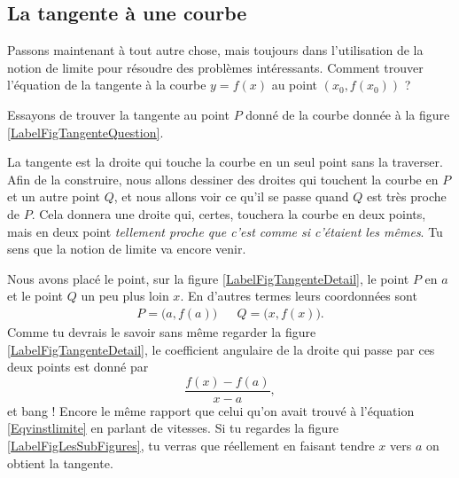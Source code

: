 \subsection{La tangente à une courbe}

Passons maintenant à tout autre chose, mais toujours dans l'utilisation de la notion de limite pour résoudre des problèmes intéressants. Comment trouver l'équation de la tangente à la courbe $y=f(x)$ au point $(x_0,f(x_0))$ ?

Essayons de trouver la tangente au point $P$ donné de la courbe donnée à la figure \ref{LabelFigTangenteQuestion}.

\newcommand{\CaptionFigTangenteQuestion}{Comment trouver la tangente à la courbe au point $P$ ?}


La tangente est la droite qui touche la courbe en un seul point sans la traverser. Afin de la construire, nous allons dessiner des droites qui touchent la courbe en $P$ et un autre point $Q$, et nous allons voir ce qu'il se passe quand $Q$ est très proche de $P$. Cela donnera une droite qui, certes, touchera la courbe en deux points, mais en deux point \emph{tellement proche que c'est comme si c'étaient les mêmes}. Tu sens que la notion de limite va encore venir.


\newcommand{\CaptionFigTangenteDetail}{Traçons d'abord une corde entre le point $P$ et un point $Q$ un peu plus loin.}



Nous avons placé le point, sur la figure \ref{LabelFigTangenteDetail}, le point $P$ en $a$ et le point $Q$ un peu plus loin $x$. En d'autres termes leurs coordonnées sont
\begin{align}
	P=\big(a,f(a)\big)&& Q=\big(x,f(x)\big).
\end{align}
Comme tu devrais le savoir sans même regarder la figure \ref{LabelFigTangenteDetail}, le coefficient angulaire de la droite qui passe par ces deux points est donné par
\begin{equation}
	\frac{ f(x)-f(a) }{ x-a },
\end{equation}
et bang ! Encore le même rapport que celui qu'on avait trouvé à l'équation \eqref{Eqvinstlimite} en parlant de vitesses. Si tu regardes la figure \ref{LabelFigLesSubFigures}, tu verras que réellement en faisant tendre $x$ vers $a$ on obtient la tangente.

